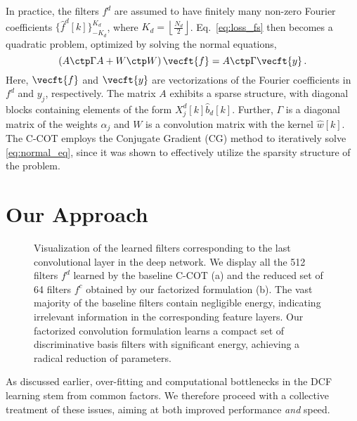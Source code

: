 \documentclass[10pt,twocolumn,letterpaper]{article}
\begin{document}
In practice, the filters $f^d$ are assumed to have finitely many non-zero Fourier coefficients $\{\hat{f}^d[k]\}_{-K_d}^{K_d}$, where $K_d = \left\lfloor \frac{N_d}{2} \right\rfloor$.
Eq.~\eqref{eq:loss_fs} then becomes a quadratic problem, optimized by solving the normal equations,
\begin{equation}
\label{eq:normal_eq}
\left( A\ctp \Gamma A + W\ctp W \right) \vecft{f} = A\ctp \Gamma \vecft{y} \,.
\end{equation}
Here, $\vecft{f}$ and $\vecft{y}$ are vectorizations of the Fourier coefficients in $f^d$ and $y_j$, respectively. The matrix $A$ exhibits a sparse structure, with diagonal blocks containing elements of the form $X^d_j[k] \hat{b}_d[k]$. Further, $\Gamma$ is a diagonal matrix of the weights $\alpha_j$ and $W$ is a convolution matrix with the kernel $\hat{w}[k]$. The C-COT \cite{DanelljanECCV2016} employs the Conjugate Gradient (CG) method \cite{NumericalOptimization} to iteratively solve \eqref{eq:normal_eq}, since it was shown to effectively utilize the sparsity structure of the problem.


 
\section{Our Approach}
\label{sec:method}

\begin{figure*}[!t]
	\centering \newcommand{\wid}{4.23cm}\vspace{-3.5mm}\hspace{1mm}
	\caption{Visualization of the learned filters corresponding to the last convolutional layer in the deep network. We display all the 512 filters $f^d$ learned by the baseline C-COT (a) and the reduced set of 64 filters $f^c$ obtained by our factorized formulation (b). The vast majority of the baseline filters contain negligible energy, indicating irrelevant information in the corresponding feature layers. Our factorized convolution formulation learns a compact set of discriminative basis filters with significant energy, achieving a radical reduction of parameters.}\vspace{-2mm}\label{fig:filters}
\end{figure*}

As discussed earlier, over-fitting and computational bottlenecks in the DCF learning stem from common factors. We therefore proceed with a collective treatment of these issues, aiming at both improved performance \emph{and} speed. 
\end{document}
